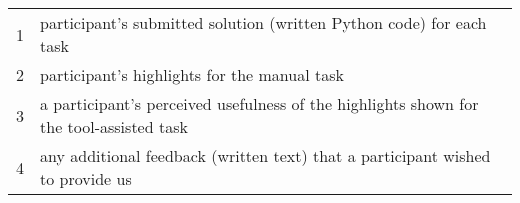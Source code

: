 \begin{table}[h!]
\centering     
\begin{small}
\begin{tabular}{ll}
1 & 
\parbox[l][0.8cm][c]{11cm}{
    participant's submitted solution (written Python code) for each task
}  
\\
%
2 & 
\parbox[l][0.8cm][c]{11cm}{
     participant's highlights for the manual task
}  \\
3 & 
\parbox[l][1cm][c]{11cm}{
    a participant's perceived usefulness of the highlights shown for the tool-assisted task
}  \\
4 & 
\parbox[l][0.8cm][c]{11cm}{
    any additional feedback (written text) that a participant wished to provide us
}  \\
\end{tabular}
\end{small}
\smallskip
\label{tbl:experiment-data}
\end{table}
    
